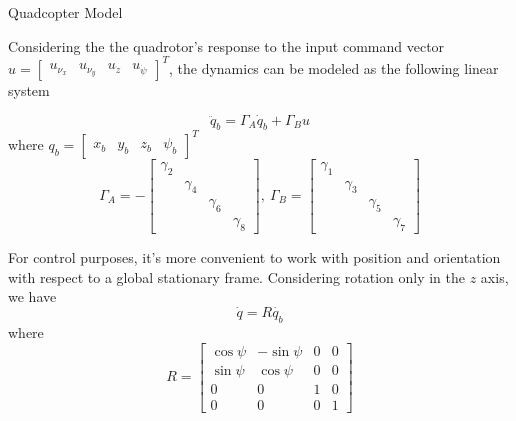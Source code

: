 
\begin{frame}{Quadcopter Model}
\begin{block}
	
Considering the the quadrotor's response to the input command vector  $u = \begin{bmatrix}
u_{\nu_x}&
u_{\nu_y}&
u_{\dot{z}}&
u_{\dot{\psi}}
\end{bmatrix}^T$, the dynamics can be modeled as the following linear system \autocite{VagoSantana2014a}

\begin{equation} \label{eq:Sant_lin}
\ddot{q}_b=\Gamma_A\dot{q}_b+\Gamma_Bu
\end{equation}
where $q_b = \begin{bmatrix}
x_b& 
{y}_b&
{z}_b&
{\psi}_b
\end{bmatrix}^T$ \begin{equation}
\Gamma_A=-\begin{bmatrix}
\gamma_2 & & & \\
&\gamma_4 & &\\
& &\gamma_6 &\\
& & &\gamma_8
\end{bmatrix}, ~\Gamma_B=\begin{bmatrix}
\gamma_1 & & & \\
&\gamma_3 & &\\
& &\gamma_5 &\\
& & &\gamma_7
\end{bmatrix}
\end{equation}

\end{block}

\end{frame}

\begin{frame}
	For control purposes, it's more convenient to work with position and orientation with respect to a global stationary frame. \newline
	\newline
	Considering rotation only in the $z$ axis, we have
	\begin{equation} \label{eq:vel_trans}
	\dot{q} = R\dot{q_b} 
	\end{equation}
	where
	\begin{equation} \label{eq:R_matrix}
	R = \begin{bmatrix}
	\cos{\psi} & -\sin{\psi} & 0 & 0 \\
	\sin{\psi} & \cos{\psi} & 0 & 0 \\
	0 & 0 & 1 & 0 \\
	0 & 0 & 0 & 1
	\end{bmatrix}
	\end{equation}
\end{frame}

